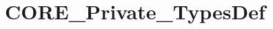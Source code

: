\hypertarget{group___c_o_r_e___private___types_def}{}\section{C\+O\+R\+E\+\_\+\+Private\+\_\+\+Types\+Def}
\label{group___c_o_r_e___private___types_def}
